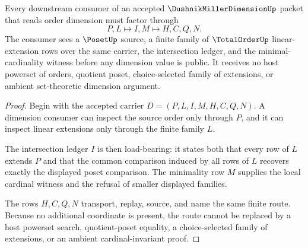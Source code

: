 \begin{theorem}
\label{thm:dushnik-miller-dimension-linear-extension-route}
Every downstream consumer of an accepted $\DushnikMillerDimensionUp$ packet that reads order dimension must factor through
$$
P,L \longmapsto I,M \longmapsto H,C,Q,N .
$$
The consumer sees a $\PosetUp$ source, a finite family of $\TotalOrderUp$ linear-extension rows over the same carrier, the intersection ledger, and the minimal-cardinality witness before any dimension value is public. It receives no host powerset of orders, quotient poset, choice-selected family of extensions, or ambient set-theoretic dimension argument.
\end{theorem}
\begin{proof}
Begin with the accepted carrier $D=(P,L,I,M,H,C,Q,N)$. A dimension consumer can inspect the source order only through $P$, and it can inspect linear extensions only through the finite family $L$.

The intersection ledger $I$ is then load-bearing: it states both that every row of $L$ extends $P$ and that the common comparison induced by all rows of $L$ recovers exactly the displayed poset comparison. The minimality row $M$ supplies the local cardinal witness and the refusal of smaller displayed families.

The rows $H,C,Q,N$ transport, replay, source, and name the same finite route. Because no additional coordinate is present, the route cannot be replaced by a host powerset search, quotient-poset equality, a choice-selected family of extensions, or an ambient cardinal-invariant proof.
\end{proof}



